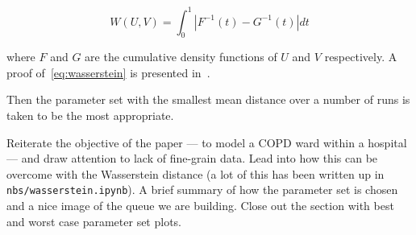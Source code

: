 \begin{equation}\label{eq:wasserstein}
    W(U, V) = \int_{0}^{1} \left\vert F^{-1}(t) - G^{-1}(t) \right\vert dt
\end{equation}

where \(F\) and \(G\) are the cumulative density functions of \(U\) and \(V\)
respectively. A proof of~\eqref{eq:wasserstein} is presented in~\cite{RTC17}.

Then the parameter set with the smallest mean distance over a number of runs is
taken to be the most appropriate.

Reiterate the objective of the paper --- to model a COPD ward within a hospital
--- and draw attention to lack of fine-grain data. Lead into how this can be
overcome with the Wasserstein distance (a lot of this has been written up in
\texttt{nbs/wasserstein.ipynb}). A brief summary of how the parameter set is
chosen and a nice image of the queue we are building. Close out the section with
best and worst case parameter set plots.
